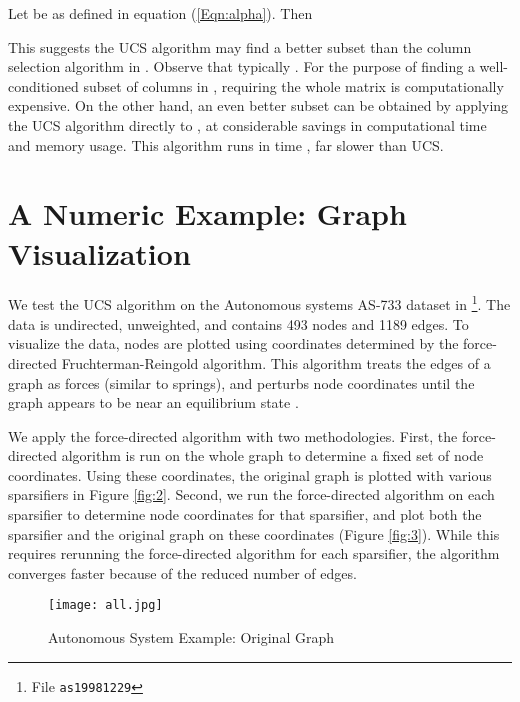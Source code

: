 \documentclass[final,leqno,onefignum,onetabnum]{siamltex1213}
\begin{document}
\begin{corollary}
Let  be as defined in equation (\ref{Eqn:alpha}).  Then

\end{corollary}
\proof
\footnotesize

\normalsize
This suggests the UCS algorithm may find a better subset than the column selection algorithm in \cite{nearoptcol}. Observe that typically . For the purpose of finding a well-conditioned subset of columns in , requiring the whole matrix  is computationally expensive. On the other hand, an even better subset can be obtained by applying the UCS algorithm directly to , at considerable savings in computational time and memory usage.  This algorithm runs in time , far slower than UCS.

\section{A Numeric Example: Graph Visualization}
We test the UCS algorithm on the Autonomous systems \mbox{AS-733} dataset in \cite{snapnets}\footnote{File {\tt as19981229}}.  The data is undirected, unweighted, and contains 493 nodes and 1189 edges.  To visualize the data, nodes are plotted using coordinates determined by the force-directed Fruchterman-Reingold algorithm.  This algorithm treats the edges of a graph as forces (similar to springs), and perturbs node coordinates until the graph appears to be near an equilibrium state \cite{FruRei91}.

We apply the force-directed algorithm with two methodologies.  First, the force-directed algorithm is run on the whole graph to determine a fixed set of node coordinates.  Using these coordinates, the original graph is plotted with various sparsifiers in Figure \ref{fig:2}.  Second, we run the force-directed algorithm on each sparsifier to determine node coordinates for that sparsifier, and plot both the sparsifier and the original graph on these coordinates (Figure \ref{fig:3}).  While this requires rerunning the force-directed algorithm for each sparsifier, the algorithm converges faster because of the reduced number of edges.

\begin{figure}[t]
\centering
    \texttt{[image: all.jpg]}
\caption[]{Autonomous System Example: Original Graph}
\label{fig:1}
\vspace{-0.5cm}
\end{figure}
\end{document}
